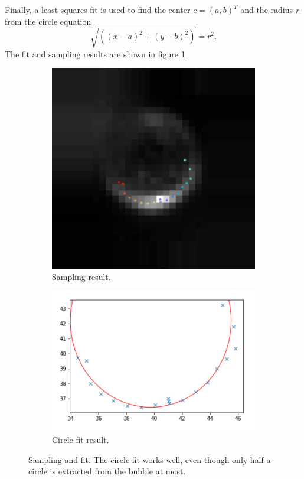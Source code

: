 				
				Finally, a least squares fit is used to find the center $c = (a,b)^T$ and the radius $r$ from the circle equation
				\begin{equation}
					\sqrt{ \left( (x-a)^2 + (y-b)^2 \right)} = r^2.
				\end{equation}
				The fit and sampling results are shown in figure \ref{fig:fit_circle_fit_result}
				
				\begin{figure}
				
					\begin{subfigure}[t]{.50\textwidth}
						\centering
						\includegraphics[scale=.8]{images/sampling_result.png}
						\caption{Sampling result. }
					\end{subfigure}					
					\begin{subfigure}[t]{.55\textwidth}
						\centering
						\includegraphics[scale=.7]{graphs/circle_fit.png}
						\caption{Circle fit result.}
					\end{subfigure}
					
					
					\caption{Sampling and fit. The circle fit works well, even though only half a circle is extracted from the bubble at most. }
					\label{fig:fit_circle_fit_result}
				\end{figure}



